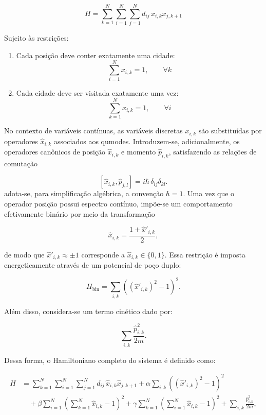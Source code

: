 $$
    \label{eq:objective_function_hamiltonian}
    H = \sum_{k=1}^N \sum_{i=1}^N \sum_{j=1}^N d_{ij}\, x_{i,k} x_{j,k+1}
$$

Sujeito às restrições:

\begin{enumerate}
    \item Cada posição deve conter exatamente uma cidade:
    $$
        \sum_{i=1}^N x_{i,k} = 1, \qquad \forall k
    $$

    \item Cada cidade deve ser visitada exatamente uma vez:
    $$
        \sum_{k=1}^N x_{i,k} = 1, \qquad \forall i
    $$
\end{enumerate}

No contexto de variáveis contínuas, as variáveis discretas $x_{i,k}$ são substituídas por operadores $\hat{x}_{i,k}$ associados aos qumodes. Introduzem-se, adicionalmente, os operadores canônicos de posição $\hat{x}_{i,k}$ e momento $\hat{p}_{i,k}$, satisfazendo as relações de comutação

$$
[\hat{x}_{i,k}, \hat{p}_{j,l}] = i\hbar\,\delta_{ij}\delta_{kl}.
$$
\noindent adota-se, para simplificação algébrica, a convenção $\hbar=1$. Uma vez que o operador posição possui espectro contínuo, impõe-se um comportamento efetivamente binário por meio da transformação


$$
\hat{x}_{i,k} = \frac{1 + \hat{x}'_{i,k}}{2},
$$

\noindent de modo que $\hat{x}'_{i,k} \approx \pm 1$ corresponde a $\hat{x}_{i,k} \in \{0,1\}$. Essa restrição é imposta energeticamente através de um potencial de poço duplo:

$$
H_{\text{bin}} = \sum_{i,k} \left( (\hat{x}'_{i,k})^2 - 1 \right)^2.
$$

Além disso, considera-se um termo cinético dado por:

$$
\sum_{i,k} \frac{\hat{p}_{i,k}^2}{2m}.
$$

Dessa forma, o Hamiltoniano completo do sistema é definido como:

\begin{equation}
\begin{aligned}
H &= \sum_{k=1}^N \sum_{i=1}^N \sum_{j=1}^N d_{ij}\, \hat{x}_{i,k}\hat{x}_{j,k+1}
    + \alpha \sum_{i,k} \left( (\hat{x}'_{i,k})^2 - 1 \right)^2 \\
    &\quad + \beta \sum_{i=1}^N \left(\sum_{k=1}^N \hat{x}_{i,k} - 1 \right)^2
    + \gamma \sum_{k=1}^N \left(\sum_{i=1}^N \hat{x}_{i,k} - 1 \right)^2
    + \sum_{i,k} \frac{\hat{p}_{i,k}^2}{2m},
\end{aligned}
\end{equation}

